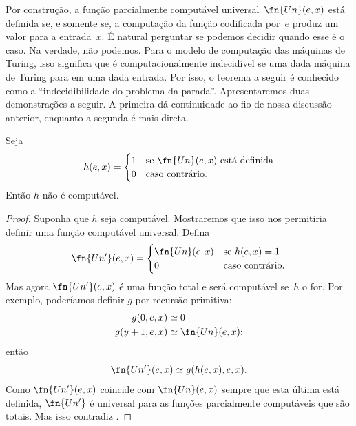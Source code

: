 \documentclass[../../../include/open-logic-section]{subfiles}
\begin{document}

Por construção, a função parcialmente computável
universal~$\fn{Un}(e,x)$ está definida se, e somente se, a computação
da função codificada por~$e$ produz um valor para a entrada~$x$. É
natural perguntar se podemos decidir quando esse é o caso. Na verdade,
não podemos. Para o modelo de computação das máquinas de Turing, isso
significa que é computacionalmente indecidível se uma dada máquina de
Turing para em uma dada entrada. Por isso, o teorema a seguir é
conhecido como a ``indecidibilidade do problema da parada''.
Apresentaremos duas demonstrações a seguir. A primeira dá continuidade
ao fio de nossa discussão anterior, enquanto a segunda é mais direta.

\begin{thm}
Seja
\[
h(e, x)  =
\begin{cases}
1 & \text{se\/ $\fn{Un}(e, x)$ está definida} \\
0 & \text{caso contrário.}
\end{cases}
\]
Então $h$ não é computável.
\end{thm}

\begin{proof}
Suponha que $h$ seja computável. Mostraremos que isso nos permitiria
definir uma função computável universal. Defina
\[
\fn{Un'}(e,x) =
\begin{cases}
\fn{Un}(e,x) & \text{se $h(e,x) = 1$} \\
0 & \text{caso contrário.}
\end{cases}
\]
Mas agora $\fn{Un'}(e, x)$ é uma função total e será computável se~$h$
o for. Por exemplo, poderíamos definir $g$ por recursão primitiva:
\begin{align*}
g(0, e, x) & \simeq 0 \\
g(y+1, e, x) & \simeq \fn{Un}(e,x);
\end{align*}
então
\[
\fn{Un'}(e,x) \simeq g(h(e,x),e,x).
\]
Como $\fn{Un'}(e,x)$ coincide com $\fn{Un}(e,x)$ sempre que esta
última está definida, $\fn{Un'}$ é universal para as funções
parcialmente computáveis que são totais. Mas isso contradiz
.
\end{proof}
\end{document}
